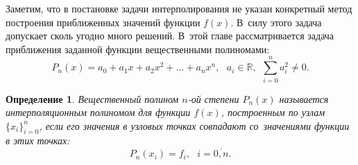 \documentclass[11pt,a4paper,twoside]{report}
\numberwithin{equation}{section}
\newtheorem*{definition}{Определение}
\theoremstyle{definition}
\theoremstyle{plain}
\begin{document}
Заметим, что в постановке задачи интерполирования не указан конкретный метод
построения приближенных значений функции $f(x)$. В~силу этого задача допускает
сколь угодно много решений. В~этой главе рассматривается
задача приближения заданной функции вещественными полиномами:
%
$$
    P_n(x)=a_0+a_1x+a_2x^{2}+\ldots+a_nx^{n}, ~~~a_i\in\mathbb{R},~~
    \sum_{i=0}^n{a_i^2} \neq 0.
$$
%
%
\begin{definition}
%
    Вещественный полином $n$-ой степени $P_n(x)$ называется интерполяционным
    полиномом для функции $f(x)$, построенным по узлам $\{x_i\}_{i=0}^n$,
    если его значения в узловых точках
    совпадают со~значениями функции в этих точках:
    \begin{equation}
    \label{interPoly}
        P_n(x_i)=f_i,~~~i=\overline{0, n}.
    \end{equation}
%
\end{definition}
%
%
\end{document}

